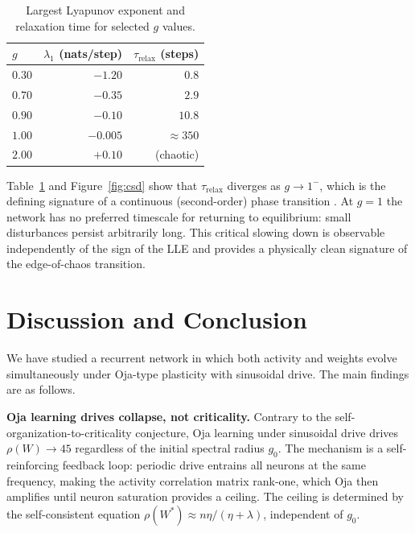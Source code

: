 \documentclass[paper=a4, fontsize=11pt]{scrartcl} %
\numberwithin{equation}{section} %
\numberwithin{figure}{section} %
\numberwithin{table}{section} %
\begin{document}
\begin{table}[H]
    \centering
    \caption{Largest Lyapunov exponent and relaxation time for selected $g$ values.}
    \label{tab:lle}
    \begin{tabular}{lrr}
    \toprule
    $g$ & $\lambda_1$ (nats/step) & $\tau_{\mathrm{relax}}$ (steps) \\
    \midrule
    $0.30$ & $-1.20$ & $0.8$ \\
    $0.70$ & $-0.35$ & $2.9$ \\
    $0.90$ & $-0.10$ & $10.8$ \\
    $1.00$ & $-0.005$ & $\approx 350$ \\
    $2.00$ & $+0.10$  & (chaotic) \\
    \bottomrule
    \end{tabular}
\end{table}

Table~\ref{tab:lle} and Figure~\ref{fig:csd} show that $\tau_{\mathrm{relax}}$
diverges as $g \to 1^-$, which is the defining signature of a continuous (second-order)
phase transition \cite{guckenheimer1983nonlinear}.  At $g = 1$ the network has no
preferred timescale for returning to equilibrium: small disturbances persist
arbitrarily long.  This critical slowing down is observable independently of the sign
of the LLE and provides a physically clean signature of the edge-of-chaos transition.


\section{Discussion and Conclusion}

We have studied a recurrent network in which both activity and weights evolve
simultaneously under Oja-type plasticity with sinusoidal drive.  The main findings are
as follows.

\textbf{Oja learning drives collapse, not criticality.}  Contrary to the
self-organization-to-criticality conjecture, Oja learning under sinusoidal drive drives
$\rho(W) \to 45$ regardless of the initial spectral radius $g_0$.  The mechanism is
a self-reinforcing feedback loop: periodic drive entrains all neurons at the same
frequency, making the activity correlation matrix rank-one, which Oja then amplifies
until neuron saturation provides a ceiling.  The ceiling is determined by the
self-consistent equation $\rho(W^*) \approx n\eta/(\eta + \lambda)$, independent of $g_0$.
\end{document}
